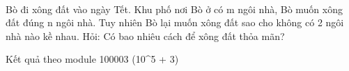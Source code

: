  

Bò đi xông đất vào ngày Tết. Khu phố nơi Bò ở có m ngôi nhà, Bò muốn xông đất đúng n ngôi nhà. Tuy nhiên Bò lại muốn xông đất sao cho không có 2 ngôi nhà nào kề nhau. Hỏi: Có bao nhiêu cách để xông đất thỏa mãn?

Kết quả theo module 100003 (10^5 + 3)

\